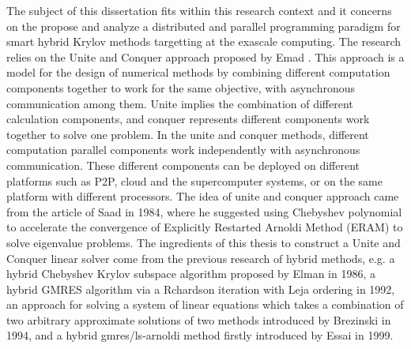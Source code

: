 The subject of this dissertation fits within this research context and it concerns on the propose and analyze a distributed and parallel programming paradigm for smart hybrid Krylov methods targetting at the exascale computing. The research relies on the Unite and Conquer approach proposed by Emad \cite{emad2016unite}. This approach is a model for the design of numerical methods by combining different computation components together to work for the same objective, with asynchronous communication among them. Unite implies the combination of different calculation components, and conquer represents different components work together to solve one problem. In the unite and conquer methods, different computation parallel components work independently with asynchronous communication. These different components can be deployed on different platforms such as P2P, cloud and the supercomputer systems, or on the same platform with different processors. The idea of unite and conquer approach came from the article of Saad \cite{saad1984chebyshev} in 1984, where he suggested using Chebyshev polynomial to accelerate the convergence of Explicitly Restarted Arnoldi Method (ERAM) to solve eigenvalue problems. The ingredients of this thesis to construct a Unite and Conquer linear solver come from the previous research of hybrid methods, e.g. a hybrid Chebyshev Krylov subspace algorithm proposed by Elman \cite{elman1986hybrid} in 1986, a hybrid GMRES algorithm via a Rchardson iteration with Leja ordering \cite{nachtigal1992hybrid} in 1992, an approach for solving a system of linear equations which takes a combination of two arbitrary approximate solutions of two methods introduced by Brezinski \cite{brezinski1994hybrid} in 1994, and a hybrid gmres/ls-arnoldi method firstly introduced by Essai \cite{essai1999heterogeneous} in 1999.

